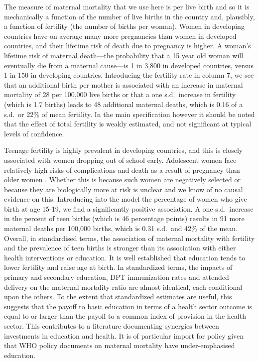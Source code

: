 \documentclass{article}[12pt,subeqn]
\begin{document}
\begin{spacing}{1.4}
The measure of maternal mortality that we use here is per live birth and so it is 
mechanically a function of the number of live births in the country and, plausibly, 
a function of fertility (the number of births per woman). Women in developing 
countries have on average many more pregnancies than women in developed countries, 
and their lifetime risk of death due to pregnancy is higher. A woman's lifetime 
risk of maternal death---the probability that a 15 year old woman will eventually 
die from a maternal cause---is 1 in 3,800 in developed countries, versus 1 in 150 
in developing countries. Introducing the fertility rate in column 7, we see that an 
additional birth per mother is associated with an 
increase in maternal mortality of 28 per 100,000 live births or that a one s.d.\ 
increase in fertility (which is 1.7 births) leads to 48 additional maternal deaths, 
which is 0.16 of a s.d.\ or 22\% of mean fertility. In the main specification 
however it should be noted that the effect of total fertility is weakly estimated, 
and not significant at typical levels of confidence.

Teenage fertility is highly prevalent in developing countries, and this is 
closely associated with women dropping out of school early. Adolescent women face 
relatively high risks of complications and death as a result of pregnancy than 
older women \citep{Condeetal2005, Pattonetal2009}.  Whether this is because such 
women are negatively selected or because they are biologically more at risk is 
unclear and we know of no causal evidence on this. Introducing into the model the 
percentage of women who give birth at age 15-19, we find a significantly positive 
association. A one s.d.\ increase in the percent of teen births (which is 46 
percentage points) results in 91 more maternal deaths per 100,000 births, which is 
0.31 s.d.\ and 42\% of the mean. Overall, in standardised terms, the association 
of maternal mortality with fertility and the prevalence of teen births is stronger 
than its association with either health interventions or education. It is well 
established that education tends to lower fertility and raise age at birth.  In 
standardized terms, the impacts of primary and secondary education, DPT 
immunization rates and attended delivery on the maternal mortality ratio are almost
identical, each conditional upon the others. To the extent that standardized 
estimates are useful, this suggests that the payoff to basic education in terms of 
a health sector outcome is equal to or larger than the payoff to a common index of 
provision in the health sector. This contributes to a literature documenting 
synergies between investments in education and health.  It is of particular import 
for policy given that WHO policy documents on maternal mortality have 
under-emphasised education.


\end{spacing}
\end{document}
